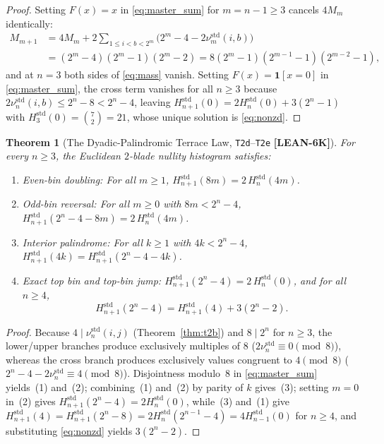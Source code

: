 \documentclass[11pt,reqno]{amsart}
\theoremstyle{plain}
\newtheorem{theorem}{Theorem}[section]
\theoremstyle{definition}
\theoremstyle{remark}
\newcommand{\tagLean}{\mbox{\textsf{\textbf{\color{oiBlue}[LEAN-6K]}}}}
\newcommand{\std}{\mathrm{std}}
\begin{document}
\begin{proof}
Setting $F(x) = x$ in \eqref{eq:master_sum} for $m = n - 1 \ge 3$ cancels $4M_m$ identically:
\begin{align*}
  M_{m+1} &= 4M_m + 2\sum_{1 \le i < b < 2^m} \bigl(2^m - 4 - 2\nu_m^{\std}(i, b)\bigr) \\
          &= (2^m - 4)(2^m - 1)(2^m - 2)
           = 8(2^m - 1)(2^{m-1} - 1)(2^{m-2} - 1),
\end{align*}
and at $n = 3$ both sides of \eqref{eq:mass} vanish. Setting $F(x) = \mathbf{1}[x = 0]$ in \eqref{eq:master_sum},
the cross term vanishes for all $n \ge 3$ because $2\nu_n^{\std}(i, b) \le 2^n - 8 < 2^n - 4$,
leaving $H_{n+1}^{\std}(0) = 2H_n^{\std}(0) + 3(2^n - 1)$ with $H_3^{\std}(0) = \binom{7}{2} = 21$,
whose unique solution is \eqref{eq:nonzd}.
\end{proof}

\begin{theorem}[The Dyadic-Palindromic Terrace Law, \texttt{T2d}--\texttt{T2e} \tagLean]
\label{thm:t2de}
For every $n \ge 3$, the Euclidean $2$-blade nullity histogram satisfies:
\begin{enumerate}[leftmargin=2em]
  \item \emph{Even-bin doubling:} For all $m \ge 1$,
    $H_{n+1}^{\std}(8m) = 2\,H_n^{\std}(4m)$.
  \item \emph{Odd-bin reversal:} For all $m \ge 0$ with $8m < 2^n - 4$,
    $H_{n+1}^{\std}(2^n - 4 - 8m) = 2\,H_n^{\std}(4m)$.
  \item \emph{Interior palindrome:} For all $k \ge 1$ with $4k < 2^n - 4$,
    $H_{n+1}^{\std}(4k) = H_{n+1}^{\std}(2^n - 4 - 4k)$.
  \item \emph{Exact top bin and top-bin jump:}
    $H_{n+1}^{\std}(2^n - 4) = 2\,H_n^{\std}(0)$, and for all $n \ge 4$,
    \begin{equation}
      H_{n+1}^{\std}(2^n - 4) = H_{n+1}^{\std}(4) + 3(2^n - 2).
    \end{equation}
\end{enumerate}
\end{theorem}

\begin{proof}
Because $4 \mid \nu_n^{\std}(i, j)$ (Theorem~\ref{thm:t2b}) and $8 \mid 2^n$ for $n \ge 3$,
the lower/upper branches produce exclusively multiples of $8$ ($2\nu_n^{\std} \equiv 0 \pmod 8$),
whereas the cross branch produces exclusively values congruent to $4 \pmod 8$
($2^n - 4 - 2\nu_n^{\std} \equiv 4 \pmod 8$). Disjointness modulo~$8$ in \eqref{eq:master_sum}
yields~(1) and~(2); combining~(1) and~(2) by parity of $k$ gives~(3); setting $m = 0$ in~(2)
gives $H_{n+1}^{\std}(2^n - 4) = 2 H_n^{\std}(0)$, while~(3) and~(1) give
$H_{n+1}^{\std}(4) = H_{n+1}^{\std}(2^n - 8) = 2 H_n^{\std}(2^{n-1} - 4) = 4 H_{n-1}^{\std}(0)$
for $n \ge 4$, and substituting \eqref{eq:nonzd} yields $3(2^n - 2)$.
\end{proof}
\end{document}
